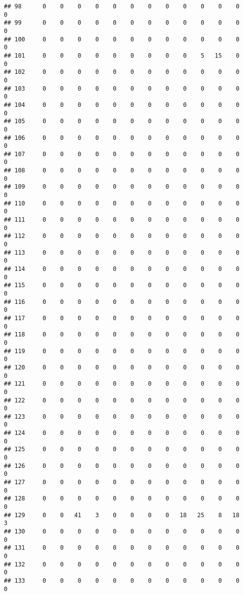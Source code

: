 \documentclass[]{article}
\begin{document}
\begin{verbatim}
## 98      0    0    0    0    0    0    0    0    0    0    0    0    0
## 99      0    0    0    0    0    0    0    0    0    0    0    0    0
## 100     0    0    0    0    0    0    0    0    0    0    0    0    0
## 101     0    0    0    0    0    0    0    0    0    5   15    0    0
## 102     0    0    0    0    0    0    0    0    0    0    0    0    0
## 103     0    0    0    0    0    0    0    0    0    0    0    0    0
## 104     0    0    0    0    0    0    0    0    0    0    0    0    0
## 105     0    0    0    0    0    0    0    0    0    0    0    0    0
## 106     0    0    0    0    0    0    0    0    0    0    0    0    0
## 107     0    0    0    0    0    0    0    0    0    0    0    0    0
## 108     0    0    0    0    0    0    0    0    0    0    0    0    0
## 109     0    0    0    0    0    0    0    0    0    0    0    0    0
## 110     0    0    0    0    0    0    0    0    0    0    0    0    0
## 111     0    0    0    0    0    0    0    0    0    0    0    0    0
## 112     0    0    0    0    0    0    0    0    0    0    0    0    0
## 113     0    0    0    0    0    0    0    0    0    0    0    0    0
## 114     0    0    0    0    0    0    0    0    0    0    0    0    0
## 115     0    0    0    0    0    0    0    0    0    0    0    0    0
## 116     0    0    0    0    0    0    0    0    0    0    0    0    0
## 117     0    0    0    0    0    0    0    0    0    0    0    0    0
## 118     0    0    0    0    0    0    0    0    0    0    0    0    0
## 119     0    0    0    0    0    0    0    0    0    0    0    0    0
## 120     0    0    0    0    0    0    0    0    0    0    0    0    0
## 121     0    0    0    0    0    0    0    0    0    0    0    0    0
## 122     0    0    0    0    0    0    0    0    0    0    0    0    0
## 123     0    0    0    0    0    0    0    0    0    0    0    0    0
## 124     0    0    0    0    0    0    0    0    0    0    0    0    0
## 125     0    0    0    0    0    0    0    0    0    0    0    0    0
## 126     0    0    0    0    0    0    0    0    0    0    0    0    0
## 127     0    0    0    0    0    0    0    0    0    0    0    0    0
## 128     0    0    0    0    0    0    0    0    0    0    0    0    0
## 129     0    0   41    3    0    0    0    0   18   25    8   18    3
## 130     0    0    0    0    0    0    0    0    0    0    0    0    0
## 131     0    0    0    0    0    0    0    0    0    0    0    0    0
## 132     0    0    0    0    0    0    0    0    0    0    0    0    0
## 133     0    0    0    0    0    0    0    0    0    0    0    0    0

\end{verbatim}
\end{document}
